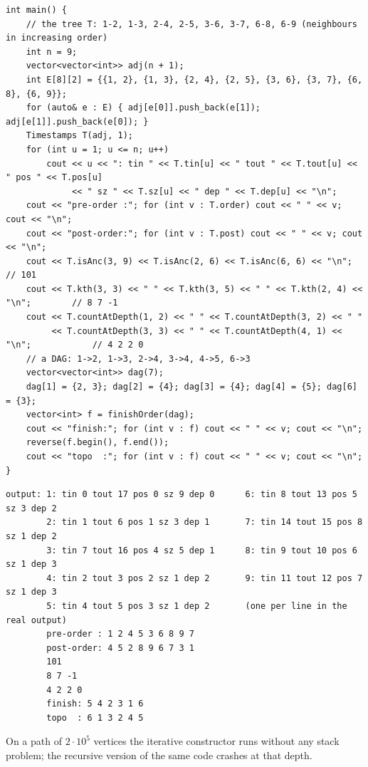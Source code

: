\begin{lstlisting}[style=cpp]
int main() {
    // the tree T: 1-2, 1-3, 2-4, 2-5, 3-6, 3-7, 6-8, 6-9 (neighbours in increasing order)
    int n = 9;
    vector<vector<int>> adj(n + 1);
    int E[8][2] = {{1, 2}, {1, 3}, {2, 4}, {2, 5}, {3, 6}, {3, 7}, {6, 8}, {6, 9}};
    for (auto& e : E) { adj[e[0]].push_back(e[1]); adj[e[1]].push_back(e[0]); }
    Timestamps T(adj, 1);
    for (int u = 1; u <= n; u++)
        cout << u << ": tin " << T.tin[u] << " tout " << T.tout[u] << " pos " << T.pos[u]
             << " sz " << T.sz[u] << " dep " << T.dep[u] << "\n";
    cout << "pre-order :"; for (int v : T.order) cout << " " << v; cout << "\n";
    cout << "post-order:"; for (int v : T.post) cout << " " << v; cout << "\n";
    cout << T.isAnc(3, 9) << T.isAnc(2, 6) << T.isAnc(6, 6) << "\n";              // 101
    cout << T.kth(3, 3) << " " << T.kth(3, 5) << " " << T.kth(2, 4) << "\n";        // 8 7 -1
    cout << T.countAtDepth(1, 2) << " " << T.countAtDepth(3, 2) << " "
         << T.countAtDepth(3, 3) << " " << T.countAtDepth(4, 1) << "\n";            // 4 2 2 0
    // a DAG: 1->2, 1->3, 2->4, 3->4, 4->5, 6->3
    vector<vector<int>> dag(7);
    dag[1] = {2, 3}; dag[2] = {4}; dag[3] = {4}; dag[4] = {5}; dag[6] = {3};
    vector<int> f = finishOrder(dag);
    cout << "finish:"; for (int v : f) cout << " " << v; cout << "\n";
    reverse(f.begin(), f.end());
    cout << "topo  :"; for (int v : f) cout << " " << v; cout << "\n";
}
\end{lstlisting}

\begin{lstlisting}[style=trace]
output: 1: tin 0 tout 17 pos 0 sz 9 dep 0      6: tin 8 tout 13 pos 5 sz 3 dep 2
        2: tin 1 tout 6 pos 1 sz 3 dep 1       7: tin 14 tout 15 pos 8 sz 1 dep 2
        3: tin 7 tout 16 pos 4 sz 5 dep 1      8: tin 9 tout 10 pos 6 sz 1 dep 3
        4: tin 2 tout 3 pos 2 sz 1 dep 2       9: tin 11 tout 12 pos 7 sz 1 dep 3
        5: tin 4 tout 5 pos 3 sz 1 dep 2       (one per line in the real output)
        pre-order : 1 2 4 5 3 6 8 9 7
        post-order: 4 5 2 8 9 6 7 3 1
        101
        8 7 -1
        4 2 2 0
        finish: 5 4 2 3 1 6
        topo  : 6 1 3 2 4 5
\end{lstlisting}
On a path of $2\cdot10^5$ vertices the iterative constructor runs without any stack problem; the recursive version of the same code crashes at that depth.

